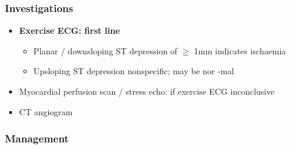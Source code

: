 \documentclass[
  12pt,
]{memoir}
\providecommand{\tightlist}{%
  \setlength{\itemsep}{0pt}\setlength{\parskip}{0pt}}
\begin{document}
\hypertarget{investigations-1}{%
\subsubsection{Investigations}\label{investigations-1}}

\begin{itemize}
\tightlist
\item
  \textbf{Exercise ECG: first line}

  \begin{itemize}
  \tightlist
  \item
    Planar / downsloping ST depression of \(\ge\) 1mm indicates
    ischaemia
  \item
    Upsloping ST depression nonspecific; may be nor -mal
  \end{itemize}
\item
  Myocardial perfusion scan / stress echo: if exercise ECG inconclusive
\item
  CT angiogram
\end{itemize}

\hypertarget{management-3}{%
\subsubsection{Management}\label{management-3}}
\end{document}
